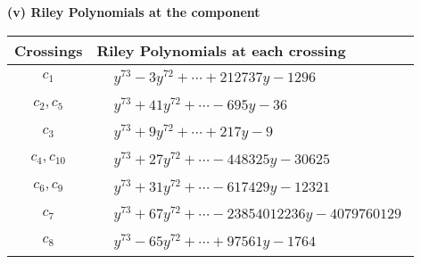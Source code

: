 \documentclass[1p]{elsarticle_modified}
\theoremstyle{definition}
\begin{document}
\newpage\renewcommand{\arraystretch}{1}
\flushleft \textbf{(v) Riley Polynomials at the component}\newline \\
\begin{tabular}{m{50pt}|m{274pt}}
Crossings & \hspace{64pt}Riley Polynomials at each crossing \\
\hline $$\begin{aligned}c_{1}\end{aligned}$$&$\begin{aligned}
&y^{73}-3 y^{72}+\cdots+212737 y-1296
\end{aligned}$\\
\hline $$\begin{aligned}c_{2},c_{5}\end{aligned}$$&$\begin{aligned}
&y^{73}+41 y^{72}+\cdots-695 y-36
\end{aligned}$\\
\hline $$\begin{aligned}c_{3}\end{aligned}$$&$\begin{aligned}
&y^{73}+9 y^{72}+\cdots+217 y-9
\end{aligned}$\\
\hline $$\begin{aligned}c_{4},c_{10}\end{aligned}$$&$\begin{aligned}
&y^{73}+27 y^{72}+\cdots-448325 y-30625
\end{aligned}$\\
\hline $$\begin{aligned}c_{6},c_{9}\end{aligned}$$&$\begin{aligned}
&y^{73}+31 y^{72}+\cdots-617429 y-12321
\end{aligned}$\\
\hline $$\begin{aligned}c_{7}\end{aligned}$$&$\begin{aligned}
&y^{73}+67 y^{72}+\cdots-23854012236 y-4079760129
\end{aligned}$\\
\hline $$\begin{aligned}c_{8}\end{aligned}$$&$\begin{aligned}
&y^{73}-65 y^{72}+\cdots+97561 y-1764
\end{aligned}$\\

\end{tabular}
\end{document}
